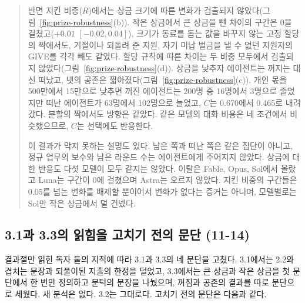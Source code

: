 \begin{quote}
{\color{black}반면 지킨 비중($R$)에서는 상금 크기에 따른 변화가 검출되지 않았다(그림~\ref{fig:prize-robustness}(b)). 작은 상금에서 큰 상금을 뺀 차이의 구간은 0을 걸쳤고($+0.01$ $[-0.02,0.04]$), 크기가 동료를 돕는 값을 바꾸지 않는 고정 할당의 짝에서도, 거절이나 되돌려 준 지원, 자기 미납 벌금을 낼 수 없던 지원자의 GIVE를 각각 빼도 같았다. 할당 규칙에 따른 차이는 두 비중 모두에서 검출되지 않았다(그림~\ref{fig:prize-robustness}(d)). 상금을 낮추자 에이전트는 꺼지는 대신 떠났고, 넷의 공존은 짧아졌다(그림~\ref{fig:prize-robustness}(c)). 개인 몫을 500만에서 15만으로 낮추면 꺼진 에이전트는 200명 중 16명에서 3명으로 줄었지만 떠난 에이전트가 63명에서 102명으로 늘었고, $C$는 0.670에서 0.465로 내려갔다. 분할의 짝에서도 방향은 같았다. 같은 모델의 대화 비용은 네 조건에서 비슷했으므로, $C$는 선택에도 반응한다.}

{\color{black}이 결과가 막지 못하는 설명도 있다. 남은 쪽과 떠난 쪽은 같은 집단이 아니고, 정규 업무의 보수와 남은 라운드 수는 에이전트에게 주어지지 않았다. 상금에 대한 반응도 다섯 모델이 모두 같지는 않았다. 이탈은 Fable, Opus, Sol에서 올랐고 Luna는 구간이 0에 걸쳤으며 Astra는 오르지 않았다. 지킨 비중의 구간들은 0.05를 넘는 변화를 배제할 뿐이어서 변화가 없다는 증거는 아니며, 모델별로는 Sol만 작은 상금에서 덜 건넸다.}
\end{quote}

\subsection{3.1과 3.3의 읽힘을 고치기 전의 문단 (11-14)}\label{app:construct-moved-16}

결과절만 읽힌 독자 둘의 지적에 따라 3.1과 3.3의 네 문단을 고쳤다. 3.1에서는 2.2와 겹치는 문장과 되풀이된 지출의 한정을 덜었고, 3.3에서는 큰 상금과 작은 상금을 첫 문단에서 한 번만 정의하고 문턱의 문장을 나눴으며, 꺼짐과 공존의 결과를 따로 문단으로 세웠다. 새 분석은 없다. 3.2는 그대로다. 고치기 전의 문단은 다음과 같다.

